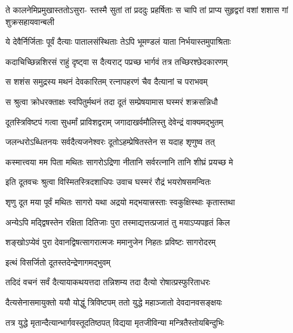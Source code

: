 \fourlineindentedshloka
{ते कालनेमिप्रमुखास्ततोऽसुरा-}
{स्तस्मै सुतां तां प्रददुः प्रहर्षिताः}
{स चापि तां प्राप्य सुहृद्वरां वशां}
{शशास गां शुक्रसहायवान्बली} %





\twolineshloka
{ये देवैर्निर्जिताः पूर्वं दैत्याः पातालसंस्थिताः}
{तेऽपि भूमण्डलं याता निर्भयास्तमुपाश्रिताः} %

\twolineshloka
{कदाचिच्छिन्नशिरसं राहुं दृष्ट्वा स दैत्यराट्}
{पप्रच्छ भार्गवं तत्र तच्छिरश्छेदकारणम्} %

\twolineshloka
{स शशंस समुद्रस्य मथनं देवकारितम्}
{रत्नापहरणं चैव दैत्यानां च पराभवम्} %

\twolineshloka
{स श्रुत्वा क्रोधरक्ताक्षः स्वपितुर्मथनं तदा}
{दूतं सम्प्रेषयामास घस्मरं शक्रसन्निधौ} %

\twolineshloka
{दूतस्त्रिविष्टपं गत्वा सुधर्मां प्राविशद्वराम्}
{जगादाखर्वमौलिस्तु देवेन्द्रं वाक्यमद्भुतम्} %


\twolineshloka
{जलन्धरोऽब्धितनयः सर्वदैत्यजनेश्वरः}
{दूतोऽहम्प्रेषितस्तेन स यदाह शृणुष्व तत्} %

\twolineshloka
{कस्मात्त्वया मम पिता मथितः सागरोऽद्रिणा}
{नीतानि सर्वरत्नानि तानि शीघ्रं प्रयच्छ मे} %

\twolineshloka
{इति दूतवचः श्रुत्वा विस्मितस्त्रिदशाधिपः}
{उवाच घस्मरं रौद्रं भयरोषसमन्वितः} %


\twolineshloka
{शृणु दूत मया पूर्वं मथितः सागरो यथा}
{अद्रयो मद्भयात्त्रस्ताः स्वकुक्षिस्थाः कृतास्तथा} %

\twolineshloka
{अन्येऽपि मद्द्विषस्तेन रक्षिता दितिजाः पुरा}
{तस्माद्यत्तत्प्रजातं तु मयाऽप्यपहृतं किल} %

\twolineshloka
{शङ्खोऽप्येवं पुरा देवानद्विषत्सागरात्मजः}
{ममानुजेन निहतः प्रविष्टः सागरोदरम्} %




\onelineshloka
{इत्थं विसर्जितो दूतस्तदेन्द्रेणागमद्भुवम्} %

\twolineshloka
{तदिदं वचनं सर्वं दैत्यायाकथयत्तदा}
{तन्निशम्य तदा दैत्यो रोषात्प्रस्फुरिताधरः} %

\twolineshloka
{दैत्यसेनासमायुक्तो ययौ योद्धुं त्रिविष्टपम्}
{ततो युद्धे महाञ्जातो देवदानवसङ्क्षयः} %

\twolineshloka
{तत्र युद्धे मृतान्दैत्यान्भार्गवस्तूदतिष्ठपत्}
{विद्यया मृतजीविन्या मन्त्रितैस्तोयबिन्दुभिः} %

